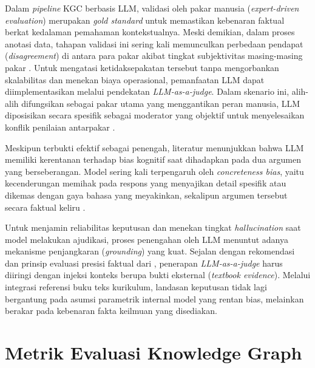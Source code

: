 \documentclass[main]{subfiles}
\begin{document}
Dalam \textit{pipeline} KGC berbasis LLM, validasi oleh pakar manusia
(\textit{expert-driven evaluation}) merupakan \textit{gold standard}
untuk memastikan kebenaran faktual berkat kedalaman pemahaman
kontekstualnya. Meski demikian, dalam proses anotasi data, tahapan
validasi ini sering kali memunculkan perbedaan pendapat
(\textit{disagreement}) di antara para pakar akibat tingkat
subjektivitas masing-masing pakar \parencite{gu_survey_nodate, zheng_judging_2023}. Untuk mengatasi ketidaksepakatan tersebut tanpa mengorbankan
skalabilitas dan menekan biaya operasional, pemanfaatan LLM dapat
diimplementasikan melalui pendekatan \textit{LLM-as-a-judge}. Dalam skenario ini,
alih-alih difungsikan sebagai pakar utama yang menggantikan peran
manusia, LLM diposisikan secara spesifik sebagai moderator yang objektif
untuk menyelesaikan konflik penilaian antarpakar \parencite{gu_survey_nodate}.

Meskipun terbukti efektif sebagai penengah, literatur menunjukkan bahwa
LLM memiliki kerentanan terhadap bias kognitif saat dihadapkan pada dua
argumen yang berseberangan. Model sering kali terpengaruh oleh
\textit{concreteness bias}, yaitu kecenderungan memihak pada respons
yang menyajikan detail spesifik atau dikemas dengan gaya bahasa yang
meyakinkan, sekalipun argumen tersebut secara faktual keliru
\parencite{gu_survey_nodate, zheng_judging_2023}.

Untuk menjamin reliabilitas keputusan dan menekan tingkat \textit{hallucination}
saat model melakukan ajudikasi, proses penengahan oleh LLM menuntut
adanya mekanisme penjangkaran (\textit{grounding}) yang kuat. Sejalan
dengan rekomendasi \textcite{gu_survey_nodate} dan prinsip evaluasi presisi
faktual dari \textcite{min_factscore_2023}, penerapan \textit{LLM-as-a-judge} harus
diiringi dengan injeksi konteks berupa bukti eksternal
(\textit{textbook evidence}). Melalui integrasi referensi buku teks
kurikulum, landasan keputusan tidak lagi bergantung pada asumsi
parametrik internal model yang rentan bias, melainkan berakar pada
kebenaran fakta keilmuan yang disediakan.

\section{Metrik Evaluasi Knowledge Graph}
\end{document}
